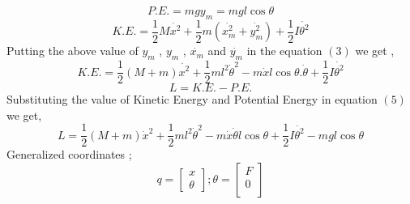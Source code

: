 \documentclass[11pt]{article}
\begin{document}
\begin{equation}
P.E. = mgy_m = mgl\cos{\theta}
\end{equation}
\begin{equation}
K.E. = \frac{1}{2}M\dot{x^2} + \frac{1}{2}m(\dot{x^2_m} + \dot{y^2_m})+\frac{1}{2}I\dot{\theta^2}
\end{equation}
{Putting the above value of $y_m$ , $y_m$  , $\dot{x_m}$ and $\dot{y_m}$ in the equation $(3)$ we get , }
\begin{equation}
K.E. = \frac{1}{2}(M+m)\dot{x^2} + \frac{1}{2}ml^2\dot{\theta}^2 - m\dot{x}l\cos{\theta}.\dot{\theta}+\frac{1}{2}I\dot{\theta^2}
\end{equation}
\begin{equation}
L = K.E. - P.E. 
\end{equation}
{Substituting the value of Kinetic Energy and Potential Energy in equation $(5)$ we get,}
$$L = \frac{1}{2}(M+m)\dot{x}^2 + \frac{1}{2}ml^2\dot{\theta}^2 - m\dot{x}\dot{\theta}l\cos{\theta}+\frac{1}{2}I\dot{\theta^2} - mgl\cos{\theta}$$
{Generalized coordinates ; }\\
$$q=\begin{bmatrix}
x\\
\theta
\end{bmatrix} ;
\theta=\begin{bmatrix}
F\\
0\\
\end{bmatrix}$$
\end{document}
